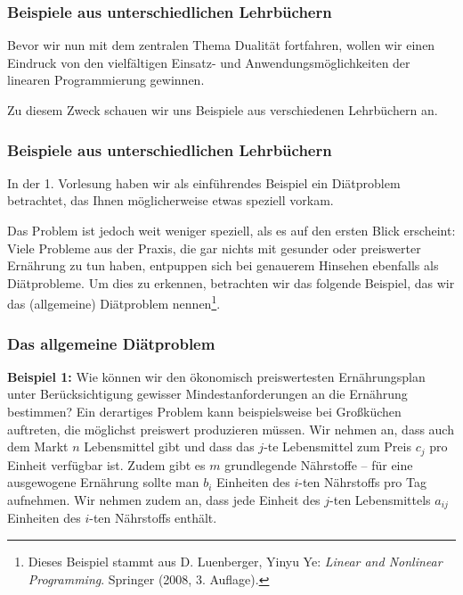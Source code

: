 \documentclass[smaller]{beamer}
\begin{document}
\begin{frame}
 \frametitle{Beispiele aus unterschiedlichen Lehrbüchern}
 Bevor wir nun mit dem zentralen Thema \alert{Dualität} fortfahren, wollen wir einen \alert{Eindruck von den vielfältigen Einsatz- und Anwendungsmöglichkeiten der linearen Programmierung} gewinnen. \\ \vspace*{0.2cm}

Zu diesem Zweck schauen wir uns Beispiele aus verschiedenen Lehrbüchern an.
 
\end{frame}

\begin{frame}
 \frametitle{Beispiele aus unterschiedlichen Lehrbüchern}
 In der \alert{1. Vorlesung} haben wir als einführendes Beispiel ein \alert{Diätproblem} betrachtet, das Ihnen möglicher\-weise etwas speziell vorkam. \\ \vspace*{0.2cm}

\alert{Das Problem ist jedoch weit weniger speziell, als es auf den ersten Blick erscheint}: Viele Probleme aus der Praxis, die gar nichts mit gesunder oder preiswerter Ernährung zu tun haben, entpuppen sich bei genauerem Hinsehen ebenfalls als {\glqq}Diätprobleme{\grqq}. Um dies zu erkennen, betrachten wir das folgende Beispiel, das wir \alert{das (allgemeine) Diätproblem} nennen\footnote{Dieses Beispiel stammt aus D. Luenberger, Yinyu Ye: \textit{Linear and Nonlinear Programming}. Springer (2008, 3. Auflage).}.
\end{frame}

\begin{frame}
 \frametitle{Das allgemeine Diätproblem}
 \textbf{Beispiel 1:} Wie können wir den ökonomisch preiswertesten Ernährungsplan unter Berücksichtigung gewisser Mindestanforderungen an die Ernährung bestimmen? Ein derartiges Problem kann beispielsweise bei Großküchen auftreten, die möglichst preiswert produzieren müssen. Wir nehmen an, dass auch dem Markt $n$ Lebensmittel gibt und dass das $j$-te Lebensmittel zum Preis $c_j$ pro Einheit verfügbar ist. Zudem gibt es $m$ grundlegende Nährstoffe -- für eine ausgewogene Ernährung sollte man $b_i$ Einheiten des $i$-ten Nährstoffs pro Tag aufnehmen. Wir nehmen zudem an, dass jede Einheit des $j$-ten Lebensmittels $a_{ij}$ Einheiten des $i$-ten Nährstoffs enthält.
\end{frame}
\end{document}
